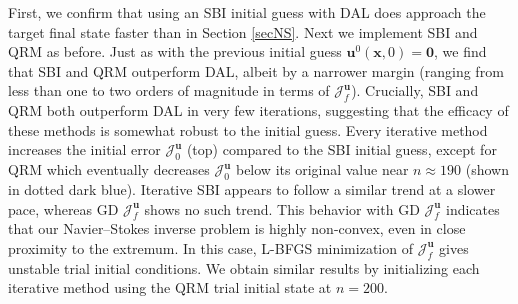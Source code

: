 \documentclass[%
 reprint,
 amsmath,amssymb,
 aps,
 pre,
]{revtex4-2}
\renewcommand{\vec}[1]{\boldsymbol{#1}}
\newcommand{\Juo}{\mathcal{J}^{u}_0}
\newcommand{\JUo}{\mathcal{J}^{\vec{u}}_0}
\newcommand{\JUf}{\mathcal{J}^{\vec{u}}_f}
\newcommand{\Jwo}{\mathcal{J}^{\omega}_0}
\begin{document}
  
  First, we confirm that using an SBI initial guess with DAL does approach the target final state faster than in Section \ref{secNS}. 
  Next we implement SBI and QRM as before. 
  Just as with the previous initial guess $\vec{u}^0(\vec{x}, 0)=\vec{0}$, we find that SBI and QRM outperform DAL, albeit by a narrower margin (ranging from less than one to two orders of magnitude in terms of $\JUf$).
Crucially, SBI and QRM both outperform DAL in very few iterations, suggesting that the efficacy of these methods is somewhat robust to the initial guess.
Every iterative method increases the initial error $\JUo$ (top) compared to the SBI initial guess, except for QRM which eventually decreases $\JUo$ below its original value near $n\approx 190$ (shown in dotted dark blue).
Iterative SBI appears to follow a similar trend at a slower pace, whereas GD $\JUf$ shows no such trend.
This behavior with GD $\JUf$ indicates that our Navier--Stokes inverse problem is highly non-convex, even in close proximity to the extremum.
In this case, L-BFGS minimization of $\JUf$ gives unstable trial initial conditions.
We obtain similar results by initializing each iterative method using the QRM trial initial state at $n=200$.



\end{document}
